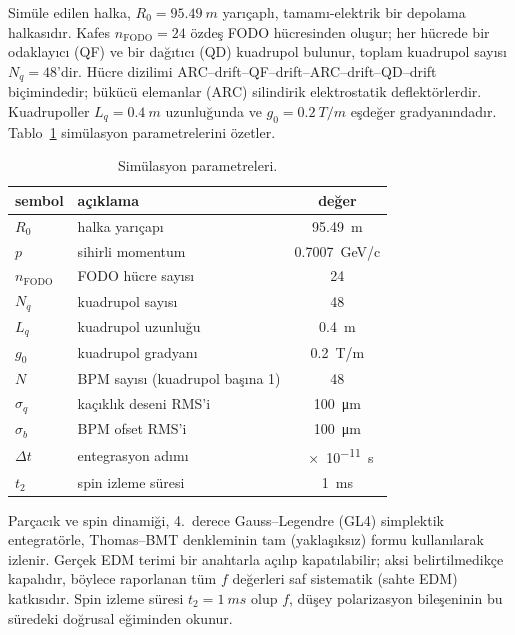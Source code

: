 \documentclass[preprint,12pt]{elsarticle}
\begin{document}
Simüle edilen halka, $R_0=\SI{95.49}{m}$ yarıçaplı, tamamı-elektrik
bir depolama halkasıdır. Kafes $n_\mathrm{FODO}=24$ özdeş FODO
hücresinden oluşur; her hücrede bir odaklayıcı (QF) ve bir dağıtıcı
(QD) kuadrupol bulunur, toplam kuadrupol sayısı $N_q=48$'dir. Hücre
dizilimi ARC--drift--QF--drift--ARC--drift--QD--drift biçimindedir;
bükücü elemanlar (ARC) silindirik elektrostatik deflektörlerdir.
Kuadrupoller $L_q=\SI{0.4}{m}$ uzunluğunda ve $g_0=\SI{0.2}{T/m}$
eşdeğer gradyanındadır. Tablo~\ref{tab:parametreler} simülasyon
parametrelerini özetler.

\begin{table}[htb]
\centering
\caption{Simülasyon parametreleri.}
\begin{tabular}{llc}
\toprule
sembol & açıklama & değer \\
\midrule
$R_0$            & halka yarıçapı                  & \SI{95.49}{m} \\
$p$              & sihirli momentum                & \SI{0.7007}{GeV/c} \\
$n_\mathrm{FODO}$& FODO hücre sayısı               & 24 \\
$N_q$            & kuadrupol sayısı                & 48 \\
$L_q$            & kuadrupol uzunluğu              & \SI{0.4}{m} \\
$g_0$            & kuadrupol gradyanı              & \SI{0.2}{T/m} \\
$N$              & BPM sayısı (kuadrupol başına 1) & 48 \\
$\sigma_q$       & kaçıklık deseni RMS'i           & \SI{100}{\micro\meter} \\
$\sigma_b$       & BPM ofset RMS'i                 & \SI{100}{\micro\meter} \\
$\Delta t$       & entegrasyon adımı               & \SI{e-11}{s} \\
$t_2$            & spin izleme süresi              & \SI{1}{ms} \\
\bottomrule
\end{tabular}
\label{tab:parametreler}
\end{table}

Parçacık ve spin dinamiği, 4.~derece Gauss--Legendre (GL4) simplektik
entegratörle, Thomas--BMT denkleminin tam (yaklaşıksız) formu
kullanılarak izlenir. Gerçek EDM terimi bir anahtarla açılıp
kapatılabilir; aksi belirtilmedikçe kapalıdır, böylece raporlanan tüm
$f$ değerleri saf sistematik (sahte EDM) katkısıdır. Spin izleme
süresi $t_2=\SI{1}{ms}$ olup $f$, düşey polarizasyon bileşeninin bu
süredeki doğrusal eğiminden okunur.
\end{document}
